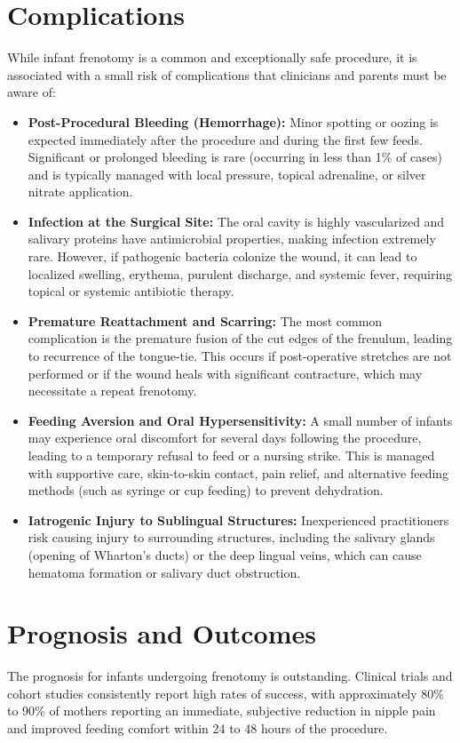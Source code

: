 \section*{Complications}
While infant frenotomy is a common and exceptionally safe procedure, it is associated with a small risk of complications that clinicians and parents must be aware of:
\begin{itemize}
  \item \textbf{Post-Procedural Bleeding (Hemorrhage):} Minor spotting or oozing is expected immediately after the procedure and during the first few feeds. Significant or prolonged bleeding is rare (occurring in less than 1\% of cases) and is typically managed with local pressure, topical adrenaline, or silver nitrate application.
  \item \textbf{Infection at the Surgical Site:} The oral cavity is highly vascularized and salivary proteins have antimicrobial properties, making infection extremely rare. However, if pathogenic bacteria colonize the wound, it can lead to localized swelling, erythema, purulent discharge, and systemic fever, requiring topical or systemic antibiotic therapy.
  \item \textbf{Premature Reattachment and Scarring:} The most common complication is the premature fusion of the cut edges of the frenulum, leading to recurrence of the tongue-tie. This occurs if post-operative stretches are not performed or if the wound heals with significant contracture, which may necessitate a repeat frenotomy.
  \item \textbf{Feeding Aversion and Oral Hypersensitivity:} A small number of infants may experience oral discomfort for several days following the procedure, leading to a temporary refusal to feed or a nursing strike. This is managed with supportive care, skin-to-skin contact, pain relief, and alternative feeding methods (such as syringe or cup feeding) to prevent dehydration.
  \item \textbf{Iatrogenic Injury to Sublingual Structures:} Inexperienced practitioners risk causing injury to surrounding structures, including the salivary glands (opening of Wharton's ducts) or the deep lingual veins, which can cause hematoma formation or salivary duct obstruction.
\end{itemize}

\section*{Prognosis and Outcomes}
The prognosis for infants undergoing frenotomy is outstanding. Clinical trials and cohort studies consistently report high rates of success, with approximately 80\% to 90\% of mothers reporting an immediate, subjective reduction in nipple pain and improved feeding comfort within 24 to 48 hours of the procedure.

